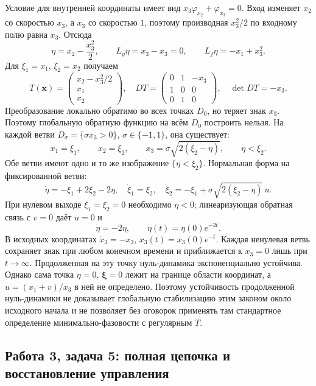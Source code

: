 Условие для внутренней координаты имеет вид
$x_3\varphi_{x_2}+\varphi_{x_3}=0$. Вход изменяет $x_2$ со скоростью
$x_3$, а $x_3$ со скоростью $1$, поэтому производная $x_3^2/2$
по входному полю равна $x_3$. Отсюда
\[
 \eta=x_2-\frac{x_3^2}{2},\qquad L_g\eta=x_3-x_3=0,
 \qquad L_f\eta=-x_1+x_3^2.
\]
Для $\xi_1=x_1$, $\xi_2=x_2$ получаем
\[
 T(\bm x)=\begin{pmatrix}x_2-x_3^2/2\\x_1\\x_2\end{pmatrix},\quad
 DT=\begin{pmatrix}0&1&-x_3\\1&0&0\\0&1&0\end{pmatrix},\quad
 \det DT=-x_3.
\]
Преобразование локально обратимо во всех точках $D_0$, но теряет
знак $x_3$. Поэтому глобальную обратную функцию на всём $D_0$
построить нельзя. На каждой ветви $D_\sigma=\{\sigma x_3>0\}$,
$\sigma\in\{-1,1\}$, она существует:
\[
 x_1=\xi_1,\qquad x_2=\xi_2,\qquad
 x_3=\sigma\sqrt{2(\xi_2-\eta)},\qquad \eta<\xi_2.
\]
Обе ветви имеют одно и то же изображение $\{\eta<\xi_2\}$.
Нормальная форма на фиксированной ветви:
\[
 \dot\eta=-\xi_1+2\xi_2-2\eta,\quad
 \dot\xi_1=\xi_2,\quad
 \dot\xi_2=-\xi_1+\sigma\sqrt{2(\xi_2-\eta)}\,u.
\]
При нулевом выходе $\xi_1=\xi_2=0$ необходимо $\eta<0$;
линеаризующая обратная связь с $v=0$ даёт $u=0$ и
\[
 \dot\eta=-2\eta,\qquad\eta(t)=\eta(0)e^{-2t}.
\]
В исходных координатах $\dot x_3=-x_3$,
$x_3(t)=x_3(0)e^{-t}$. Каждая ненулевая ветвь сохраняет знак при
любом конечном времени и приближается к $x_3=0$ лишь при $t\to\infty$.
Продолженная на эту точку нуль-динамика экспоненциально устойчива.
Однако сама точка $\eta=0$, $\bm\xi=0$ лежит на границе области
координат, а $u=(x_1+v)/x_3$ в ней не определено.
Поэтому устойчивость продолженной нуль-динамики не доказывает
глобальную стабилизацию этим законом около исходного начала и
не позволяет без оговорок применять там стандартное определение
минимально-фазовости с регулярным $T$.

\subsection{Работа 3, задача 5: полная цепочка и восстановление управления}

